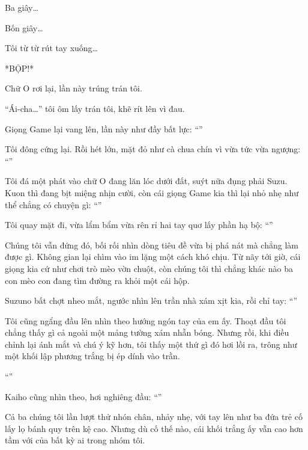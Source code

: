\documentclass[../main.tex]{subfiles}
\begin{document}
Ba giây\dots\

Bốn giây\dots\

Tôi từ từ rút tay xuống\dots

*BỘP!*

Chữ O rơi lại, lần này trúng trán tôi.

``Ái-cha\dots'' tôi ôm lấy trán tôi, khẽ rít lên vì đau.

Giọng Game lại vang lên, lần này như đầy bất lực: ``''

Tôi đông cứng lại. Rồi hét lớn, mặt đỏ như cà chua chín vì vừa tức vừa ngượng: ``''

Tôi đá một phát vào chữ O đang lăn lóc dưới đất, suýt nữa đụng phải Suzu. Kuon thì đang bịt miệng nhịn cười, còn cái giọng Game kia thì lại nhỏ nhẹ như thể chẳng có chuyện gì: ``''

Tôi quay mặt đi, vừa lẩm bẩm vừa rên rỉ hai tay quơ lấy phần hạ bộ: ``''

\ct


Chúng tôi vẫn đứng đó, bối rối nhìn dòng tiêu đề vừa bị phá nát mà chẳng làm được gì. Không gian lại chìm vào im lặng một cách khó chịu. Từ nãy tới giờ, cái giọng  kia cứ như chơi trò mèo vờn chuột, còn chúng tôi thì chẳng khác nào ba con mèo con đang tìm đường ra khỏi một cái hộp.

Suzuno bất chợt nheo mắt, ngước nhìn lên trần nhà xám xịt kia, rồi chỉ tay: ``''

Tôi cũng ngẩng đầu lên nhìn theo hướng ngón tay của em ấy. Thoạt đầu tôi chẳng thấy gì cả ngoài một mảng tường xám nhẵn bóng. Nhưng rồi, khi điều chỉnh lại ánh mắt và chú ý kỹ hơn, tôi thấy một thứ gì đó hơi lồi ra, trông như một khối lập phương trắng bị ép dính vào trần.


``''

Kaiho cũng nhìn theo, hơi nghiêng đầu: ``''

Cả ba chúng tôi lần lượt thử nhón chân, nhảy nhẹ, với tay lên như ba đứa trẻ cố lấy lọ bánh quy trên kệ cao. Nhưng dù cố thế nào, cái khối trắng ấy vẫn cao hơn tầm với của bất kỳ ai trong nhóm tôi.
\end{document}
